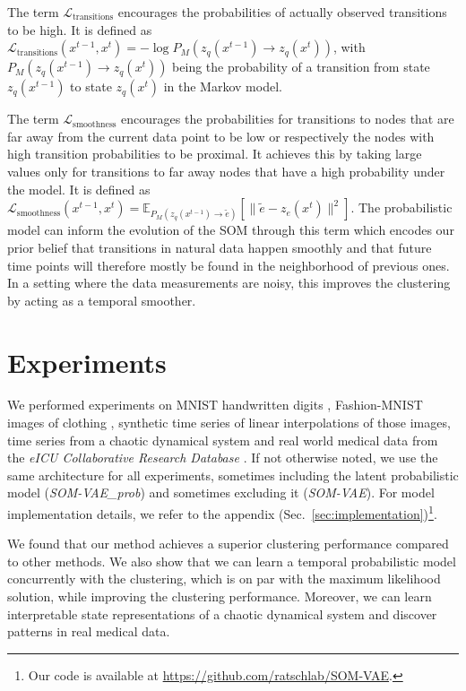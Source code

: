 The term $\mathcal{L}_{\text{transitions}}$ encourages the probabilities of actually observed transitions to be high.
It is defined as $\mathcal{L}_{\text{transitions}}(x^{t-1}, x^t) = - \log P_{M} (z_q(x^{t-1}) \rightarrow z_q(x^t))$, with $P_{M} (z_q(x^{t-1}) \rightarrow z_q(x^t))$ being the probability of a transition from state $z_q(x^{t-1})$ to state $z_q(x^t)$ in the Markov model.

The term $\mathcal{L}_{\text{smoothness}}$ encourages the probabilities for transitions to nodes that are far away from the current data point to be low or respectively the nodes with high transition probabilities to be proximal.
It achieves this by taking large values only for transitions to far away nodes that have a high probability under the model.
It is defined as $\mathcal{L}_{\text{smoothness}}(x^{t-1}, x^t) = \mathbb{E}_{P_{M} \left( z_q(x^{t-1}) \rightarrow \tilde{e} \right) } \left[ \| \tilde{e} - z_e(x^t) \|^2 \right]$.
The probabilistic model can inform the evolution of the SOM through this term which encodes our prior belief that transitions in natural data happen smoothly and that future time points will therefore mostly be found in the neighborhood of previous ones.
In a setting where the data measurements are noisy, this improves the clustering by acting as a temporal smoother.


\section{Experiments}\label{sec:experiments}

We performed experiments on MNIST handwritten digits \citep{LeCun1998}, Fashion-MNIST images of clothing \citep{Xiao2017}, synthetic time series of linear interpolations of those images, time series from a chaotic dynamical system and real world medical data from the \emph{eICU Collaborative Research Database} \citep{Goldberger2000}.
If not otherwise noted, we use the same architecture for all experiments, sometimes including the latent probabilistic model (\emph{SOM-VAE\_prob}) and sometimes excluding it (\emph{SOM-VAE}).
For model implementation details, we refer to the appendix (Sec.~\ref{sec:implementation})\footnote{Our code is available at \url{https://github.com/ratschlab/SOM-VAE}.}.

We found that our method achieves a superior clustering performance compared to other methods.
We also show that we can learn a temporal probabilistic model concurrently with the clustering, which is on par with the maximum likelihood solution, while improving the clustering performance.
Moreover, we can learn interpretable state representations of a chaotic dynamical system and discover patterns in real medical data.


